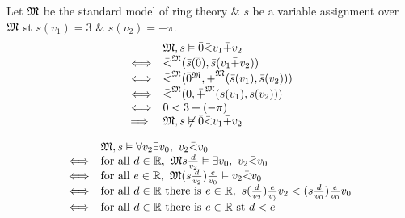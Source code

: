 \documentclass[11pt,a4paper]{article}
\begin{document}
Let $\mathfrak{M}$ be the standard model of ring theory \& $s$ be a variable assignment over $\mathfrak{M}$ st $s(v_1)=3$ \& $s(v_2)=-\pi$.\\
\[\begin{array}{rl}
&\mathfrak{M},s\vDash\bar0\bar< v_1\bar+v_2\\
\Longleftrightarrow&\bar<^{\mathfrak{M}}(\bar{s}(\bar0),\bar{s}(v_1\bar+v_2))\\
\Longleftrightarrow&\bar<^{\mathfrak{M}}(\bar{0}^{\mathfrak{M}},\bar{+}^{\mathfrak{M}}(\bar{s}(v_1),\bar{s}(v_2)))\\
\Longleftrightarrow&\bar<^{\mathfrak{M}}(0,\bar{+}^{\mathfrak{M}}(s(v_1),s(v_2)))\\
\Longleftrightarrow&0<3+(-\pi)\\
\implies&\mathfrak{M},s\not\vDash\bar0\bar< v_1\bar+v_2
\end{array}\]

\[\begin{array}{rl}
&\M,s\vDash\forall v_2\exists v_0,\ v_2\bar<v_0\\
\Longleftrightarrow&\text{for all }d\in\reals,\ \M s\frac{d}{v_2}\vDash\exists v_0,\ v_2\bar<v_0\\
\Longleftrightarrow&\text{for all }e\in\reals,\ \M(s\frac{d}{v_2})\frac{e}{v_0}\vDash v_2\bar<v_0\\
\Longleftrightarrow&\text{for all }d\in\reals\text{ there is }e\in\reals,\ s(\frac{d}{v_2})\frac{e}{v_)}v_2<(s\frac{d}{v_0})\frac{e}{v_0}v_0\\
\Longleftrightarrow&\text{for all }d\in\reals\text{ there is }e\in\reals\text{ st }d<e
\end{array}\]
\end{document}
